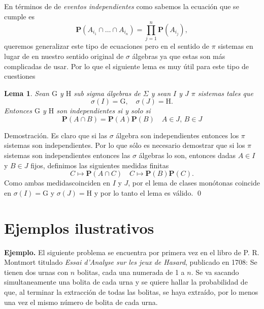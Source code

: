 \documentclass[letterpaper]{book}
\newtheorem{lema}[teorema]{Lema}
\newcommand{\prob}{\textbf{P}}
\newcommand{\exe}{{\newline \noindent \sc \textbf{Ejemplo. }}}
\newcommand{\dem}{{\noindent \sc Demostraci\'on. }}
\newcommand{\sig}{\ensuremath{\Sigma}}
\begin{document}
En términos de de \emph{eventos independientes} como sabemos la ecuación que se cumple es
\[
    \prob(A_{i_1}\cap\dots\cap A_{i_n})=\prod_{j=1}^n\prob(A_{i_j}),
\]
\noindent queremos generalizar este tipo de ecuaciones pero en el sentido de \(\pi\) sistemas en lugar de en nuestro sentido original de \(\sigma\) álgebras ya que estas son más complicadas de usar. Por lo que el siguiente lema es muy útil para este tipo de cuestiones
\begin{lema}\label{sigma_ind}
Sean $\mathrm{G}$ y $\mathrm{H}$ sub sigma álgebras de $\sig$ y sean $I$ y $J$ $\pi$ sistemas tales que
\[
    \sigma(I)=\mathrm{G},\quad\sigma(J)=\mathrm{H}.
\]
Entonces $\mathrm{G}$ y $\mathrm{H}$ son independientes si y solo si
\[
    \prob(A\cap B)=\prob(A)\prob(B)\quad A\in J,\,B\in J
\]
\end{lema}
\dem
Es claro que si las \(\sigma\) álgebra son independientes entonces los \(\pi\) sistemas son independientes. Por lo que sólo es necesario demostrar que si los \(\pi\) sistemas son independientes entonces las \(\sigma\) álgebras lo son, entonces dadas \(A\in I\) y \(B\in J\) fijos, definimos las siguientes medidas finitas
\[
    C\mapsto\prob(A\cap C)\quad C\mapsto\prob(B)\prob(C).
\]
\noindent Como ambas medidascoinciden en \(I\) y \(J\), por el lema de clases monótonas coincide en \(\sigma(I)=\mathrm{G}\) y \(\sigma(J)=\mathrm{H}\) y por lo tanto el lema es válido.
\qed
\section{Ejemplos ilustrativos}
\label{sec:org4c448eb}
\exe El siguiente problema se encuentra por primera vez en el libro de P. R. Montmort titulado \emph{Essai d'Analyse sur les jeux de Hasard}, publicado en 1708: Se tienen dos urnas con \(n\) bolitas, cada una numerada de 1 a \(n\). Se va sacando simultaneamente una bolita de cada urna y se quiere hallar la probabilidad de que, al terminar la extracción de todas las bolitas, se haya extraído, por lo menos una vez el mismo número de bolita de cada urna.
\end{document}
